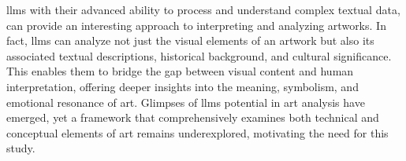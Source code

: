 \glspl{llm} with their advanced ability to process and understand complex textual data, can provide an interesting approach to interpreting and analyzing artworks. In fact, \glspl{llm} can analyze not just the visual elements of an artwork but also its associated textual descriptions, historical background, and cultural significance.  This enables them to bridge the gap between visual content and human interpretation, offering deeper insights into the meaning, symbolism, and emotional resonance of art. Glimpses of \glspl{llm} potential in art analysis have emerged, yet a framework that comprehensively examines both technical and conceptual elements of art remains underexplored, motivating the need for this study.